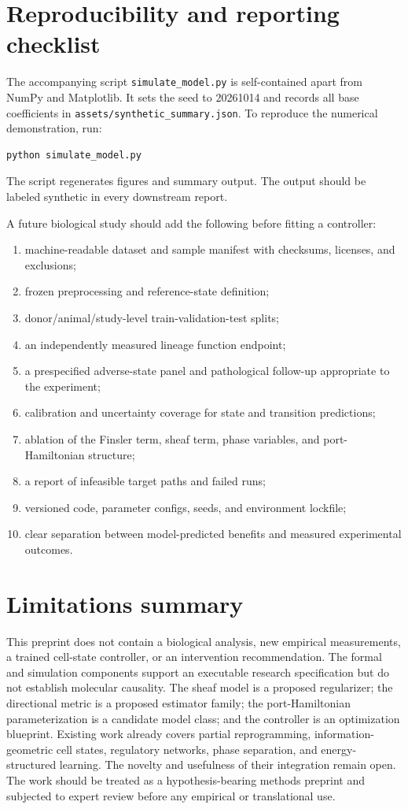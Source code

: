 \documentclass[11pt,a4paper]{article}
\theoremstyle{definition}
\theoremstyle{remark}
\begin{document}
\section{Reproducibility and reporting checklist}
The accompanying script \texttt{simulate\_model.py} is self-contained apart from NumPy and Matplotlib. It sets the seed to 20261014 and records all base coefficients in \texttt{assets/synthetic\_summary.json}. To reproduce the numerical demonstration, run:
\begin{verbatim}
python simulate_model.py
\end{verbatim}
The script regenerates figures and summary output. The output should be labeled synthetic in every downstream report.

A future biological study should add the following before fitting a controller:
\begin{enumerate}
\item machine-readable dataset and sample manifest with checksums, licenses, and exclusions;
\item frozen preprocessing and reference-state definition;
\item donor/animal/study-level train-validation-test splits;
\item an independently measured lineage function endpoint;
\item a prespecified adverse-state panel and pathological follow-up appropriate to the experiment;
\item calibration and uncertainty coverage for state and transition predictions;
\item ablation of the Finsler term, sheaf term, phase variables, and port-Hamiltonian structure;
\item a report of infeasible target paths and failed runs;
\item versioned code, parameter configs, seeds, and environment lockfile;
\item clear separation between model-predicted benefits and measured experimental outcomes.
\end{enumerate}

\section{Limitations summary}
This preprint does not contain a biological analysis, new empirical measurements, a trained cell-state controller, or an intervention recommendation. The formal and simulation components support an executable research specification but do not establish molecular causality. The sheaf model is a proposed regularizer; the directional metric is a proposed estimator family; the port-Hamiltonian parameterization is a candidate model class; and the controller is an optimization blueprint. Existing work already covers partial reprogramming, information-geometric cell states, regulatory networks, phase separation, and energy-structured learning. The novelty and usefulness of their integration remain open. The work should be treated as a hypothesis-bearing methods preprint and subjected to expert review before any empirical or translational use.
\end{document}
